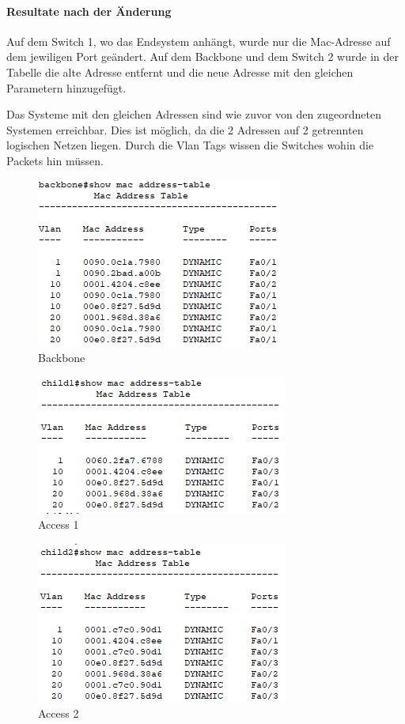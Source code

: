 \paragraph{Resultate nach der Änderung}
Auf dem Switch 1, wo das Endsystem anhängt, wurde nur die Mac-Adresse auf dem jewiligen Port geändert.
Auf dem Backbone und dem Switch 2 wurde in der Tabelle die alte Adresse entfernt und die neue Adresse mit den gleichen Parametern hinzugefügt.

Das Systeme mit den gleichen Adressen sind wie zuvor von den zugeordneten Systemen erreichbar. Dies ist möglich, da die 2 Adressen auf 2 getrennten logischen Netzen liegen. Durch die Vlan Tags wissen die Switches wohin die Packets hin müssen.
\begin{figure}[!htb]
    \centering
    \includegraphics[width=.8\textwidth,keepaspectratio]{./img/SAT/Result/BB.png}
    \caption{Backbone}
\end{figure}
\begin{figure}[!htb]
    \centering
    \includegraphics[width=.8\textwidth,keepaspectratio]{./img/SAT/Result/S1.png}
    \caption{Access 1}
\end{figure}
\begin{figure}[!htb]
    \centering
    \includegraphics[width=.8\textwidth,keepaspectratio]{./img/SAT/Result/S2.png}
    \caption{Access 2}
\end{figure}
\FloatBarrier